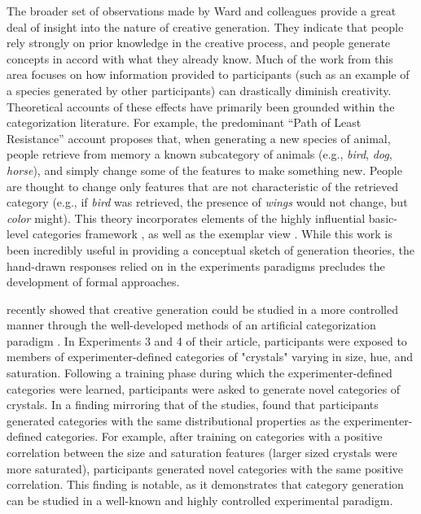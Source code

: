 \documentclass[12pt]{article}
\begin{document}
\begin{flushleft}
The broader set of observations made by Ward and colleagues provide a great deal of insight into the nature of creative generation. They indicate that people rely strongly on prior knowledge in the creative process, and people generate concepts in accord with what they already know. Much of the work from this area \citep[e.g.,][]{smith1993constraining,marsh1999inadvertent} focuses on how information provided to participants (such as an example of a species generated by other participants) can drastically diminish creativity. Theoretical accounts of these effects have primarily been grounded within the categorization literature. For example, the predominant ``Path of Least Resistance'' account \citep[see][]{ward1994structured,ward1995s,ward2002role} proposes that, when generating a new species of animal, people retrieve from memory a known subcategory of animals (e.g., {\em bird}, {\em dog}, {\em horse}), and simply change some of the features to make something new. People are thought to change only features that are not characteristic of the retrieved category (e.g., if {\em bird} was retrieved, the presence of {\em wings} would not change, but {\em color} might). This theory incorporates elements of the highly influential basic-level categories framework \citep{rosch1975cognitive,rosch1976basic}, as well as the exemplar view \citep{medin1978context,brooks1978nonanalytic}. While this work is been incredibly useful in providing a conceptual sketch of generation theories, the hand-drawn responses relied on in the experiments paradigms precludes the development of formal approaches.

\cite{jern2013probabilistic} recently showed that creative generation could be studied in a more controlled manner through the well-developed methods of an artificial categorization paradigm \citep[see][for a review]{kurtz2015human}. In Experiments 3 and 4 of their article, participants were exposed to members of experimenter-defined categories of "crystals" varying in size, hue, and saturation. Following a training phase during which the experimenter-defined categories were learned, participants were asked to generate novel categories of crystals. In a finding mirroring that of the \cite{ward1994structured} studies, \cite{jern2013probabilistic} found that participants generated categories with the same distributional properties as the experimenter-defined categories. For example, after training on categories with a positive correlation between the size and saturation features (larger sized crystals were more saturated), participants generated novel categories with the same positive correlation. This finding is notable, as it demonstrates that category generation can be studied in a well-known and highly controlled experimental paradigm. 


\end{flushleft}
\end{document}
